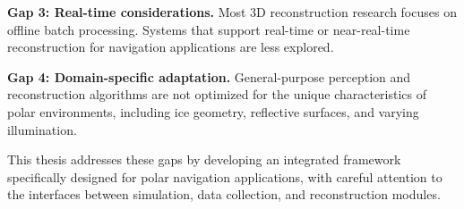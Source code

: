 \textbf{Gap 3: Real-time considerations.} Most 3D reconstruction research focuses on offline batch processing. Systems that support real-time or near-real-time reconstruction for navigation applications are less explored.

\textbf{Gap 4: Domain-specific adaptation.} General-purpose perception and reconstruction algorithms are not optimized for the unique characteristics of polar environments, including ice geometry, reflective surfaces, and varying illumination.

This thesis addresses these gaps by developing an integrated framework specifically designed for polar navigation applications, with careful attention to the interfaces between simulation, data collection, and reconstruction modules.
